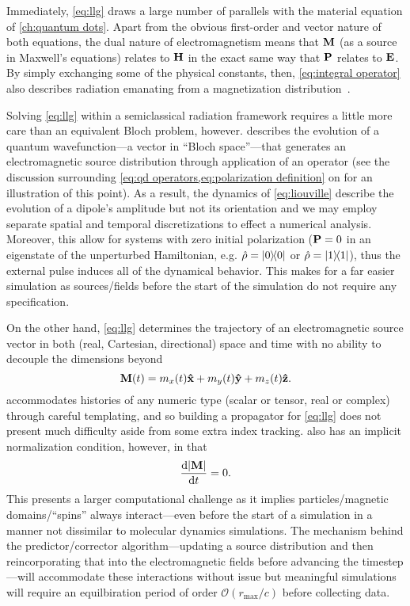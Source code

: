 Immediately, \cref{eq:llg} draws a large number of parallels with the material equation of  \cref{ch:quantum dots}.
Apart from the obvious first-order and vector nature of both equations, the dual nature of electromagnetism means that $\vb{M}$ (as a source in Maxwell's equations) relates to $\vb{H}$ in the exact same way that $\vb{P}$ relates to $\vb{E}$.
By simply exchanging some of the physical constants, then, \cref{eq:integral operator} also describes radiation emanating from a magnetization distribution~\cite{Rothwell2009}.

Solving \cref{eq:llg} within a semiclassical radiation framework requires a little more care than an equivalent Bloch problem, however.
 describes the evolution of a quantum wavefunction---a vector in ``Bloch space''---that generates an electromagnetic source distribution through application of an operator (see the discussion surrounding \cref{eq:qd operators,eq:polarization definition} on  for an illustration of this point).
As a result, the dynamics of \cref{eq:liouville} describe the evolution of a dipole's amplitude but not its orientation and we may employ separate spatial and temporal discretizations to effect a numerical analysis.
Moreover, this allow for systems with zero initial polarization ($\vb{P} = 0$ in an eigenstate of the unperturbed Hamiltonian, e.g. $\hat{\rho} = \op{0}{0}$ or $\hat{\rho} = \op{1}{1}$), thus the external pulse induces all of the dynamical behavior.
This makes for a far easier simulation as sources/fields before the start of the simulation do not require any specification.

On the other hand, \cref{eq:llg} determines the trajectory of an electromagnetic source vector in both (real, Cartesian, directional) space and time with no ability to decouple the dimensions beyond
\begin{equation}
  \vb{M}(t) = m_x(t) \vu{x} + m_y(t) \vu{y} + m_z(t) \vu{z}.
\end{equation}
\QuEST{} accommodates histories of any numeric type (scalar or tensor, real or complex) through careful templating, and so building a propagator for \cref{eq:llg} does not present much difficulty aside from some extra index tracking.
 also has an implicit normalization condition, however, in that
\begin{equation}
  \dv{\abs{\vb{M}}}{t} = 0.
\end{equation}
This presents a larger computational challenge as it implies particles/magnetic domains/``spins'' always interact---even before the start of a simulation in a manner not dissimilar to molecular dynamics simulations.
The mechanism behind the predictor/corrector algorithm---updating a source distribution and then reincorporating that into the electromagnetic fields before advancing the timestep---will accommodate these interactions without issue but meaningful simulations will require an equilbiration period of order $\mathcal{O}(r_\text{max}/c)$ before collecting data.
